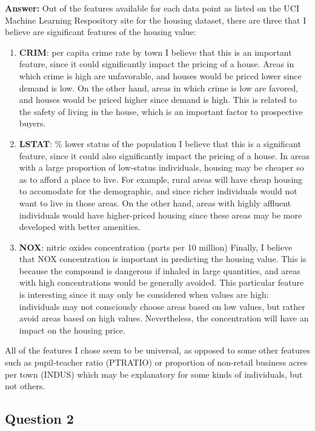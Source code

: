 \documentclass{article}
\begin{document}
    \textbf{Answer: } Out of the features available for each data point as
listed on the UCI Machine Learning Respository site for the housing
dataset, there are three that I believe are significant features of the
housing value:

\begin{enumerate}
\def\labelenumi{\arabic{enumi}.}
\item
  \textbf{CRIM}: per capita crime rate by town I believe that this is an
  important feature, since it could significantly impact the pricing of
  a house. Areas in which crime is high are unfavorable, and houses
  would be priced lower since demand is low. On the other hand, areas in
  which crime is low are favored, and houses would be priced higher
  since demand is high. This is related to the safety of living in the
  house, which is an important factor to prospective buyers.
\item
  \textbf{LSTAT}: \% lower status of the population I believe that this
  is a significant feature, since it could also significantly impact the
  pricing of a house. In areas with a large proportion of low-status
  individuals, housing may be cheaper so as to afford a place to live.
  For example, rural areas will have cheap housing to accomodate for the
  demographic, and since richer individuals would not want to live in
  those areas. On the other hand, areas with highly affluent individuals
  would have higher-priced housing since these areas may be more
  developed with better amenities.
\item
  \textbf{NOX}: nitric oxides concentration (parts per 10 million)
  Finally, I believe that NOX concentration is important in predicting
  the housing value. This is because the compound is dangerous if
  inhaled in large quantities, and areas with high concentrations would
  be generally avoided. This particular feature is interesting since it
  may only be considered when values are high: individuals may not
  consciously choose areas based on low values, but rather avoid areas
  based on high values. Nevertheless, the concentration will have an
  impact on the housing price.
\end{enumerate}

All of the features I chose seem to be universal, as opposed to some
other features such as pupil-teacher ratio (PTRATIO) or proportion of
non-retail business acres per town (INDUS) which may be explanatory for
some kinds of individuals, but not others.

    \subsection{Question 2}\label{question-2}
\end{document}
